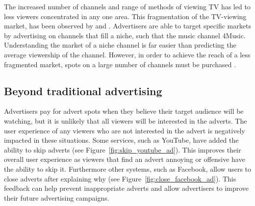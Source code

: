 
	The increased number of channels and range of methods of viewing TV has led to less viewers concentrated in any one area. This fragmentation of the TV-viewing market, has been observed by \citet{audienceFragmentation} and \citet{informationOverload}. Advertisers are able to target specific markets by advertising on channels that fill a niche, such that the music channel 4Music. Understanding the market of a niche channel is far easier than predicting the average viewership of the channel. However, in order to achieve the reach of a less fragmented market, spots on a large number of channels must be purchased \citep{addressableAdvertisingOnDigitalTV}.



	
\subsection{Beyond traditional advertising}
	\label{sec:beyond_traditional_advertising}

	Advertisers pay for advert spots when they believe their target audience will be watching, but it is unlikely that all viewers will be interested in the adverts. The user experience of any viewers who are not interested in the advert is negatively impacted in these situations. Some services, such as YouTube, have added the ability to skip adverts (see Figure~\ref{fig:skip_youtube_ad}). This improves their overall user experience as viewers that find an advert annoying or offensive have the ability to skip it. Furthermore other systems, such as Facebook, allow users to close adverts after explaining why (see Figure~\ref{fig:close_facebook_ad}). This feedback can help prevent inappropriate adverts and allow advertisers to improve their future advertising campaigns. 


